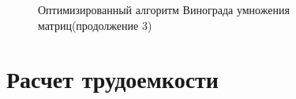 \documentclass[a4paper,12pt]{report}
\begin{document}
\begin{figure}[ht!]
\caption{Оптимизированный алгоритм Винограда умножения матриц(продолжение 3)}
\end{figure}

\newpage

\section{Расчет трудоемкости}
\end{document}

